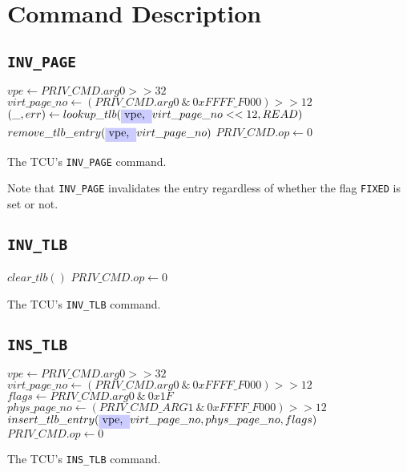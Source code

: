 \section{Command Description}

\subsection{\texttt{INV\_PAGE}}

\begin{algorithm}[H]
    \colorbox{pemux}{$vpe \gets PRIV\_CMD.arg0 >> 32$}\;
    $virt\_page\_no \gets (PRIV\_CMD.arg0\ \&\ 0xFFFF\_F000) >> 12$\;
    \BlankLine
    $(\_, err) \gets lookup\_tlb(\colorbox{pemux}{vpe, }virt\_page\_no << 12, READ)$\;
    \BlankLine
    $remove\_tlb\_entry(\colorbox{pemux}{vpe, }virt\_page\_no)$\;
    $PRIV\_CMD.op \gets 0$\;
    \caption{The TCU's \texttt{INV\_PAGE} command.}
\end{algorithm}

\noindent Note that \texttt{INV\_PAGE} invalidates the entry regardless of whether the flag
\texttt{FIXED} is set or not.

\subsection{\texttt{INV\_TLB}}

\begin{algorithm}[H]
    $clear\_tlb()$\;
    $PRIV\_CMD.op \gets 0$\;
    \caption{The TCU's \texttt{INV\_TLB} command.}
\end{algorithm}

\subsection{\texttt{INS\_TLB}}

\begin{algorithm}[H]
    \colorbox{pemux}{$vpe \gets PRIV\_CMD.arg0 >> 32$}\;
    $virt\_page\_no \gets (PRIV\_CMD.arg0\ \&\ 0xFFFF\_F000) >> 12$\;
    $flags \gets PRIV\_CMD.arg0\ \&\ 0x1F$\;
    $phys\_page\_no \gets (PRIV\_CMD\_ARG1\ \&\ 0xFFFF\_F000) >> 12$\;
    \BlankLine
    \BlankLine
    $insert\_tlb\_entry(\colorbox{pemux}{vpe, }virt\_page\_no, phys\_page\_no, flags)$\;
    $PRIV\_CMD.op \gets 0$\;
    \caption{The TCU's \texttt{INS\_TLB} command.}
\end{algorithm}
\extend{}

